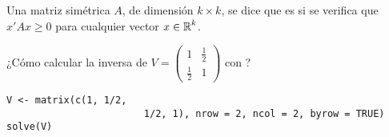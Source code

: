 Una matriz simétrica $A$, de dimensión $k\times k$, se dice que es  si se verifica que $x'Ax\ge0$ para cualquier vector $x\in\operatorname{\mathbb{R}}^k$.

¿Cómo calcular la inversa de $V=\begin{pmatrix}
1 & \tfrac{1}{2}\\
\tfrac{1}{2} & 1
\end{pmatrix}$ con ?

\vspace{0.5cm}

\begin{lstlisting}
V <- matrix(c(1, 1/2,
						1/2, 1), nrow = 2, ncol = 2, byrow = TRUE)
solve(V)
\end{lstlisting}